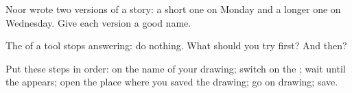 \begin{exercise}[$\star\star$]\label{exo:g2:using-a-computer:9}
Noor wrote two versions of a story: a short one on Monday and a longer one on
Wednesday. Give each version a good name.
\end{exercise}

\begin{exercise}[$\star\star$]\label{exo:g2:using-a-computer:10}
The  of a tool stops answering:  do nothing. What should you try
first? And then?
\end{exercise}

\begin{exercise}[$\star\star$]\label{exo:g2:using-a-computer:11}
Put these steps in order:  on the name of your drawing; switch on
the ; wait until the  appears; open the place where you saved
the drawing; go on drawing; save.
\end{exercise}
